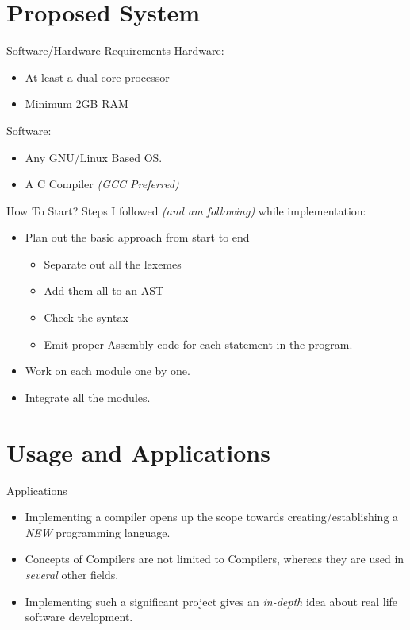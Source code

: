\documentclass[dvipsnames]{beamer}
\begin{document}
\section{Proposed System}
\begin{frame}{Software/Hardware Requirements}
Hardware:
\begin{itemize}
\item At \alert{least} a dual core processor
\item Minimum \alert{2GB} RAM
\end{itemize}
Software:
\begin{itemize}
\item Any GNU/Linux Based OS.
\item A C Compiler \emph{(GCC Preferred)}
\end{itemize}
\end{frame}

\begin{frame}{How To Start?}
Steps I followed \emph{(and am following)} while implementation:
\begin{itemize}
\item Plan out the basic approach from start to end
	\begin{itemize}
	\item Separate out all the \alert{lexemes} 
	\item Add them all to an \alert{AST}
	\item Check the syntax
	\item \alert{Emit} proper Assembly code for each statement in the program.
	\end{itemize}
\item Work on each module \alert{one by one}.
\item Integrate all the modules.
\end{itemize}
\end{frame}

\section{Usage and Applications}
\begin{frame}{Applications}
\begin{itemize}
\item Implementing a compiler opens up the scope towards creating/establishing a \emph{\alert{NEW}} programming language.
\item Concepts of Compilers are not limited to Compilers, whereas they are used in \alert{\emph{several}} other fields.
\item Implementing such a significant project gives an \alert{\emph{in-depth}} idea about real life software development.
\end{itemize}
\end{frame}
\end{document}
